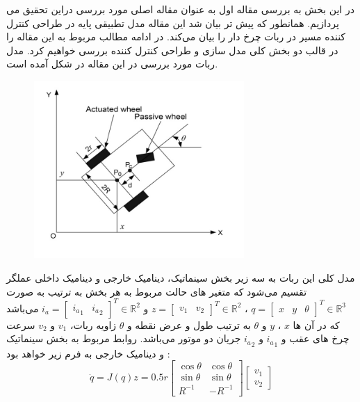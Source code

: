 در این بخش به بررسی مقاله اول به عنوان مقاله اصلی مورد بررسی دراین تحقیق می پردازیم. همانطور که پیش تر بیان شد این مقاله مدل تطبیقی پایه در طراحی کنترل کننده مسیر در ربات چرخ دار را بیان می‌کند. در ادامه مطالب مربوط به این مقاله را در قالب دو بخش کلی مدل سازی و طراحی کنترل کننده بررسی خواهیم کرد.
مدل ربات مورد بررسی در این مقاله در شکل آمده است. 
\begin{figure}
	\centering
	\includegraphics[width=8cm]{img/MobileRobot.jpg}
\end{figure}
مدل کلی این ربات به سه زیر بخش سینماتیک،‌ دینامیک خارجی و دینامیک داخلی عملگر تقسیم می‌شود که متغیر های حالت مربوط به هر بخش به ترتیب به صورت
$
q=
\begin{bmatrix}
	x  & y & \theta
\end{bmatrix}^T 
\in \mathbb{R}^3
$
،
$
z=
\begin{bmatrix}
	v_1  & v_2
\end{bmatrix}^T 
\in \mathbb{R}^2
$
و
$
i_a=
\begin{bmatrix}
	{i_a}_1  & {i_a}_2 
\end{bmatrix}^T 
\in \mathbb{R}^2
$
می‌باشد که در آن ها 
$x$
،
$y$
و
$\theta$
به ترتیب طول و عرض نقطه 
و $\theta$ زاویه ربات، 
$v_1$
و
$v_2$
سرعت چرخ های عقب و 
${i_a}_{1}$
و
${i_a}_{2}$
جریان دو موتور می‌باشد.
روابط مربوط به بخش سینماتیک و دینامیک خارجی به فرم زیر خواهد بود :
\begin{equation}
	\dot{q}=J(q)z = 0.5r
	\begin{bmatrix}
		\cos\theta & \cos\theta \\
		\sin\theta & \sin\theta   \\
		R^{-1}       & -R^{-1}
	\end{bmatrix}
	\begin{bmatrix}
		v_1  \\
		v_2
	\end{bmatrix}
\end{equation}
